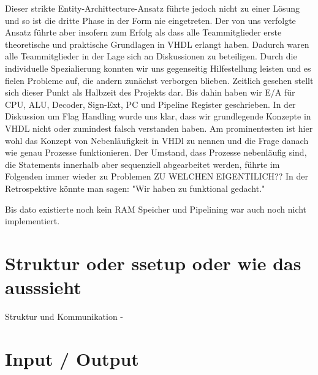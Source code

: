 \documentclass[paper=a4,fontsize=12pt]{scrreprt}
\begin{document}
Dieser strikte Entity-Archittecture-Ansatz führte jedoch nicht zu einer Lösung und so ist die dritte Phase in der Form nie eingetreten. Der von uns verfolgte Ansatz führte aber insofern zum Erfolg als dass alle Teammitglieder erste theoretische und praktische Grundlagen in VHDL erlangt haben.
Dadurch waren alle Teammitglieder in der Lage sich an Diskussionen zu beteiligen. Durch die individuelle Spezialierung konnten wir uns gegenseitig Hilfestellung leisten und es fielen Probleme auf, die andern zunächst verborgen blieben. Zeitlich gesehen stellt sich dieser Punkt als Halbzeit des Projekts dar.
Bis dahin haben wir E/A für CPU, ALU, Decoder, Sign-Ext, PC und Pipeline Register geschrieben.
In der Diskussion um Flag Handling wurde uns klar, dass wir grundlegende Konzepte in VHDL nicht oder zumindest falsch verstanden haben. Am prominentesten ist hier wohl das Konzept von Nebenläufigkeit in VHDl zu nennen und die Frage danach wie genau Prozesse funktionieren. Der Umstand, dass Prozesse nebenläufig sind, die Statements innerhalb aber sequenziell abgearbeitet werden, führte im Folgenden immer wieder zu Problemen {\color{red}ZU WELCHEN EIGENTILICH??}
In der Retrospektive könnte man sagen: "Wir haben zu funktional gedacht."


Bis dato existierte noch kein RAM Speicher und Pipelining war auch noch nicht implementiert.


\section{Struktur oder ssetup oder wie das ausssieht}
Struktur und Kommunikation -

\section{Input / Output}
\end{document}
